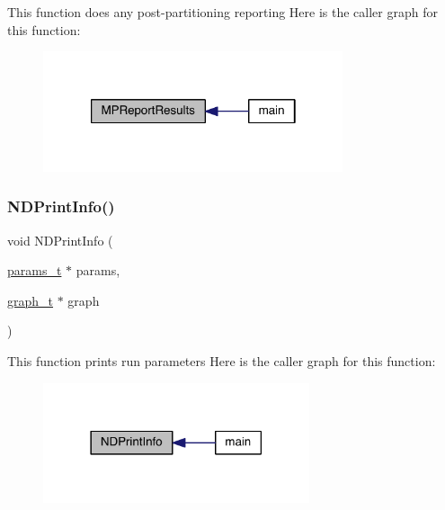 This function does any post-\/partitioning reporting Here is the caller graph for this function\+:\nopagebreak
\begin{figure}[H]
\begin{center}
\leavevmode
\includegraphics[width=250pt]{a00948_a236149f75cde8a4272e20cdcad0b9db2_icgraph}
\end{center}
\end{figure}
\mbox{\label{a00948_aef57dff33874ea99e9584665424dbf22}} 
\subsubsection{\texorpdfstring{N\+D\+Print\+Info()}{NDPrintInfo()}}
{\footnotesize\ttfamily void N\+D\+Print\+Info (\begin{DoxyParamCaption}\item[{\hyperlink{a00706}{params\+\_\+t} $\ast$}]{params,  }\item[{\hyperlink{a00734}{graph\+\_\+t} $\ast$}]{graph }\end{DoxyParamCaption})}

This function prints run parameters Here is the caller graph for this function\+:\nopagebreak
\begin{figure}[H]
\begin{center}
\leavevmode
\includegraphics[width=222pt]{a00948_aef57dff33874ea99e9584665424dbf22_icgraph}
\end{center}
\end{figure}
\mbox{\label{a00948_ae474b9ac69c59e61afcdd45e4c2913f0}} 
